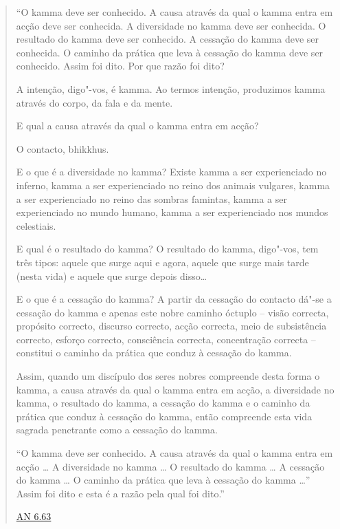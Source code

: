 \clearpage

\begin{quote}

  ``O kamma deve ser conhecido. A causa através da qual o kamma entra em acção
  deve ser conhecida. A diversidade no kamma deve ser conhecida. O resultado do
  kamma deve ser conhecido. A cessação do kamma deve ser conhecida. O caminho da
  prática que leva à cessação do kamma deve ser conhecido. Assim foi dito. Por
  que razão foi dito?

  A intenção, digo"-vos, é kamma. Ao termos intenção, produzimos kamma através do
  corpo, da fala e da mente.

  E qual a causa através da qual o kamma entra em acção?

  O contacto, bhikkhus.

  E o que é a diversidade no kamma? Existe kamma a ser experienciado no inferno,
  kamma a ser experienciado no reino dos animais vulgares, kamma a ser
  experienciado no reino das sombras famintas, kamma a ser experienciado no
  mundo humano, kamma a ser experienciado nos mundos celestiais.

  E qual é o resultado do kamma? O resultado do kamma, digo"-vos, tem três tipos:
  aquele que surge aqui e agora, aquele que surge mais tarde (nesta vida) e
  aquele que surge depois disso\ldots{}

  E o que é a cessação do kamma? A partir da cessação do contacto dá"-se a
  cessação do kamma e apenas este nobre caminho óctuplo -- visão correcta,
  propósito correcto, discurso correcto, acção correcta, meio de subsistência
  correcto, esforço correcto, consciência correcta, concentração correcta --
  constitui o caminho da prática que conduz à cessação do kamma.

  Assim, quando um discípulo dos seres nobres compreende desta forma o kamma, a
  causa através da qual o kamma entra em acção, a diversidade no kamma, o
  resultado do kamma, a cessação do kamma e o caminho da prática que conduz à
  cessação do kamma, então compreende esta vida sagrada penetrante como a
  cessação do kamma.

  ``O kamma deve ser conhecido. A causa através da qual o kamma entra em acção
  \ldots{} A diversidade no kamma \ldots{} O resultado do kamma \ldots{} A
  cessação do kamma \ldots{} O caminho da prática que leva à cessação do kamma
  \ldots{}'' Assim foi dito e esta é a razão pela qual foi dito.''

  \href{https://suttacentral.net/an6.63/en/thanissaro}{AN 6.63}

\end{quote}

